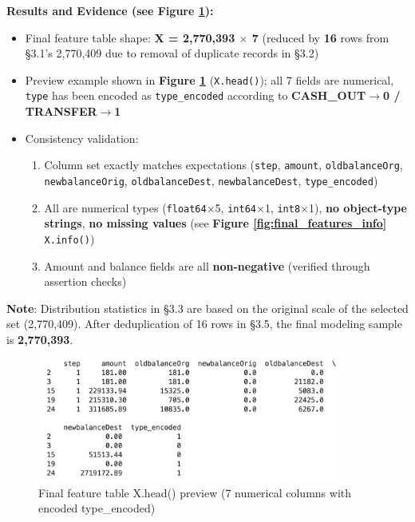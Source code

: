 \documentclass[sigplan,screen]{acmart}
\begin{document}
\textbf{Results and Evidence (see Figure \ref{fig:final_features_preview}):}

\begin{itemize}
    \item Final feature table shape: \textbf{X = 2,770,393 $\times$ 7} (reduced by \textbf{16} rows from \S3.1's 2,770,409 due to removal of duplicate records in \S3.2)
    \item Preview example shown in \textbf{Figure \ref{fig:final_features_preview}} (\texttt{X.head()}); all 7 fields are numerical, \texttt{type} has been encoded as \texttt{type\_encoded} according to \textbf{CASH\_OUT$\rightarrow$0 / TRANSFER$\rightarrow$1}
    \item Consistency validation:
\begin{enumerate}
        \item Column set exactly matches expectations (\texttt{step}, \texttt{amount}, \texttt{oldbalanceOrg}, \texttt{newbalanceOrig}, \texttt{oldbalanceDest}, \texttt{newbalanceDest}, \texttt{type\_encoded})
        \item All are numerical types (\texttt{float64}$\times$5, \texttt{int64}$\times$1, \texttt{int8}$\times$1), \textbf{no object-type strings}, \textbf{no missing values} (see \textbf{Figure \ref{fig:final_features_info}} \texttt{X.info()})
        \item Amount and balance fields are all \textbf{non-negative} (verified through assertion checks)
\end{enumerate}
\end{itemize}

\textbf{Note}: Distribution statistics in \S3.3 are based on the original scale of the selected set (2,770,409). After deduplication of 16 rows in \S3.5, the final modeling sample is \textbf{2,770,393}.

\begin{figure}[h!]
    \centering
    \includegraphics[width=0.9\textwidth]{3.5a.png}
    \caption{Final feature table X.head() preview (7 numerical columns with encoded type\_encoded)}
    \label{fig:final_features_preview}
\end{figure}
\end{document}
